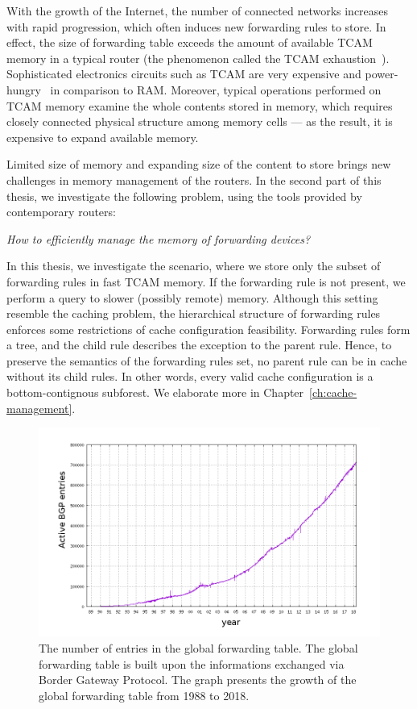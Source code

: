 With the growth of the Internet, the number of connected networks increases with rapid progression, which often induces new forwarding rules to store.
In effect, the size of forwarding table exceeds the amount of available TCAM memory in a typical router (the phenomenon called the TCAM exhaustion~\cite{tcam-exhaust}).
Sophisticated electronics circuits such as TCAM are very expensive and power-hungry~\cite{tcam-expensive} in comparison to RAM.
Moreover, typical operations performed on TCAM memory examine the whole contents stored in memory, which requires closely connected physical structure among memory cells --- as the result, it is expensive to expand available memory.

Limited size of memory and expanding size of the content to store brings new challenges in memory management of the routers.
In the second part of this thesis, we investigate the following problem, using the tools provided by contemporary routers:
\begin{center}
  \emph{How to efficiently manage the memory of forwarding devices?}
\end{center}

In this thesis, we investigate the scenario, where we store only the subset of forwarding rules in fast TCAM memory.
If the forwarding rule is not present, we perform a query to slower (possibly remote) memory.
Although this setting resemble the caching problem, the hierarchical structure of forwarding rules enforces some restrictions of cache configuration feasibility.
Forwarding rules form a tree, and the child rule describes the exception to the parent rule.
Hence, to preserve the semantics of the forwarding rules set, no parent rule can be in cache without its child rules.
In other words, every valid cache configuration is a bottom-contignous subforest.
We elaborate more in Chapter~\ref{ch:cache-management}.


\begin{figure}[t]
\centering
\includegraphics[width=0.59\columnwidth]{figs/bgp-entries.png}
\caption{The number of entries in the global forwarding table. The global forwarding table is built upon the informations exchanged via Border Gateway Protocol. The graph presents the growth of the global forwarding table from 1988 to 2018.}\label{fig:bgp-entries}
\end{figure}

